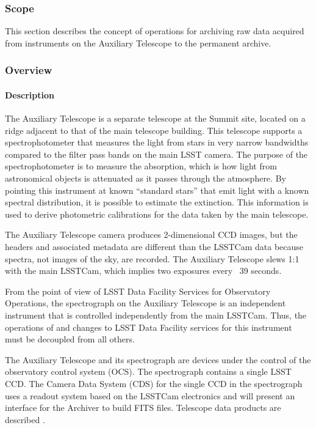 \subsubsection{Scope}

This section describes the concept of operations for archiving raw data acquired
from instruments on the Auxiliary Telescope to the permanent archive.

\subsubsection{Overview}

\paragraph{Description}

The Auxiliary Telescope is a separate telescope at the Summit site, located on a
ridge adjacent to that of the main telescope building. This telescope supports a
spectrophotometer that measures the light from stars in very narrow bandwidths
compared to the filter pass bands on the main LSST camera. The purpose of the
spectrophotometer is to measure the absorption, which is how light from astronomical
objects is attenuated as it passes through the atmosphere. By pointing this instrument
at known “standard stars” that emit light with a known spectral distribution, it is
possible to estimate the extinction. This information is used to derive photometric
calibrations for the data taken by the main telescope.

The Auxiliary Telescope camera produces 2-dimensional CCD images, but the headers
and associated metadata are different than the LSSTCam data because spectra, not
images of the sky, are recorded. The Auxiliary Telescope slews 1:1 with the main LSSTCam,
which implies two exposures every ~39 seconds.

From the point of view of LSST Data Facility Services for Observatory Operations, the
spectrograph on the Auxiliary Telescope is an independent instrument that is controlled
independently from the main LSSTCam. Thus, the operations of and changes to LSST
Data Facility services for this instrument must be decoupled from all others.

The Auxiliary Telescope and its spectrograph are devices under the
control of the observatory control system (OCS). The spectrograph
contains a single LSST CCD. The Camera Data System (CDS) for the single CCD in the
spectrograph uses a readout system based on the LSSTCam electronics and will
present an interface for the Archiver to build FITS files. Telescope data products
are described .

